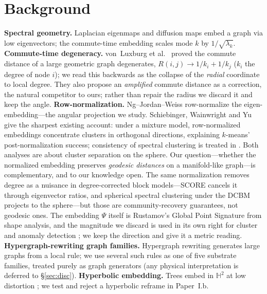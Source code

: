 \documentclass[11pt]{article}
\theoremstyle{remark}
\begin{document}
\section{Background}
\textbf{Spectral geometry.} Laplacian eigenmaps \cite{belkin2003} and diffusion
maps \cite{coifman2006} embed a graph via low eigenvectors; the commute-time
embedding scales mode $k$ by $1/\sqrt{\lambda_k}$. \textbf{Commute-time
degeneracy.} von~Luxburg et al.\ \cite{vonluxburg2014} proved the commute distance
of a large geometric graph degenerates, $R(i,j)\to 1/k_i + 1/k_j$ ($k_i$ the
degree of node $i$); we read this backwards as the collapse of the \emph{radial}
coordinate to local degree. They also propose an \emph{amplified} commute
distance as a correction, the natural competitor to ours; rather than repair the
radius we discard it and keep the angle. \textbf{Row-normalization.} Ng--Jordan--Weiss
\cite{ng2002} row-normalize the eigen-embedding---the angular projection we
study. Schiebinger, Wainwright and Yu \cite{schiebinger2015} give the
sharpest existing account: under a mixture model, row-normalized embeddings
concentrate clusters in orthogonal directions, explaining $k$-means'
post-normalization success; consistency of spectral clustering is treated in
\cite{vonluxburg2008}. Both analyses are about cluster separation on the sphere.
Our question---whether the normalized embedding preserves \emph{geodesic
distances} on a manifold-like graph---is complementary, and to our knowledge
open. The same normalization removes degree as a nuisance in degree-corrected
block models---SCORE \cite{jin2015score} cancels it through eigenvector ratios,
and spherical spectral clustering under the DCBM \cite{qinrohe2013} projects to
the sphere---but those are community-recovery guarantees, not geodesic ones. The
embedding $\Psi$ itself is Rustamov's Global Point Signature \cite{rustamov2007}
from shape analysis, and the magnitude we discard is used in its own right for
cluster and anomaly detection \cite{chengmishne}; we keep the direction and give
it a metric reading. \textbf{Hypergraph-rewriting graph families.} Hypergraph
rewriting \cite{wolfram2020,gorard2020} generates large graphs from a local rule;
we use several such rules as one of five substrate families, treated purely as
graph generators (any physical interpretation is deferred to \S\ref{sec:disc}).
\textbf{Hyperbolic
embedding.} Trees embed in $\mathbb{H}^2$ at low distortion
\cite{gromov1987,sarkar2011,nickel2017}; we test and reject a hyperbolic reframe
in Paper~I.b.
\end{document}
